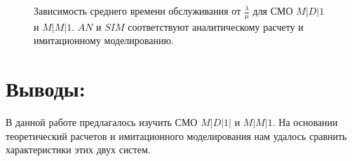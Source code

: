 \documentclass[a4paper,12 pt]{article}
\begin{document}
\begin{figure}[H]%
	\caption{Зависимость среднего времени обслуживания от $\frac{\lambda}{\mu}$ для СМО $M|D|1$ и $M|M|1$. $AN$ и $SIM$ соответствуют аналитическому расчету и имитационному моделированию.}
	\label{fig:md1}
\end{figure}
\section*{Выводы:}
В данной работе предлагалось изучить СМО $M|D|1|$ и $M|M|1$. На основании теоретический расчетов и имитационного моделирования нам удалось сравнить характеристики этих двух систем.


\end{document}
